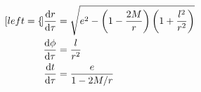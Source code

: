 
\begin{subequations}
\label{cap2:eq:orbits}
    \begin{align}[left = {\empheqlbrace}]
        \dv{r}{\tau} &= \sqrt{e^2 - \left(1 - \frac{2M}{r}\right)
        \left(1 + \frac{l^2}{r^2}\right)} \label{cap2:eq:r_of_tau} \\
        \dv{\phi}{\tau} &= \frac{l}{r^2} \label{cap2:eq:phi_of_tau}\\
        \dv{t}{\tau} &= \frac{e}{1 - 2 M / r} \label{cap2:eq:t_of_tau}
    \end{align}
\end{subequations}


